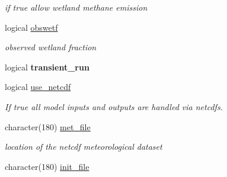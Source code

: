 \begin{DoxyCompactItemize}
\begin{DoxyCompactList}\small\item\em if true allow wetland methane emission \end{DoxyCompactList}\item 
\hypertarget{structctem__statevars_1_1ctem__switches_a009ff20d4bbfe0d7435397cf39fda85a}{}logical \hyperlink{structctem__statevars_1_1ctem__switches_a009ff20d4bbfe0d7435397cf39fda85a}{obswetf}\label{structctem__statevars_1_1ctem__switches_a009ff20d4bbfe0d7435397cf39fda85a}

\begin{DoxyCompactList}\small\item\em observed wetland fraction \end{DoxyCompactList}\item 
\hypertarget{structctem__statevars_1_1ctem__switches_a38ff512e235b3dd8a02c05d4d990ab99}{}logical {\bfseries transient\+\_\+run}\label{structctem__statevars_1_1ctem__switches_a38ff512e235b3dd8a02c05d4d990ab99}

\item 
\hypertarget{structctem__statevars_1_1ctem__switches_adaf384e9a0bf0224b86b6877b2473133}{}logical \hyperlink{structctem__statevars_1_1ctem__switches_adaf384e9a0bf0224b86b6877b2473133}{use\+\_\+netcdf}\label{structctem__statevars_1_1ctem__switches_adaf384e9a0bf0224b86b6877b2473133}

\begin{DoxyCompactList}\small\item\em If true all model inputs and outputs are handled via netcdfs. \end{DoxyCompactList}\item 
\hypertarget{structctem__statevars_1_1ctem__switches_a163869d14a74656d7aa94eebc86025ec}{}character(180) \hyperlink{structctem__statevars_1_1ctem__switches_a163869d14a74656d7aa94eebc86025ec}{met\+\_\+file}\label{structctem__statevars_1_1ctem__switches_a163869d14a74656d7aa94eebc86025ec}

\begin{DoxyCompactList}\small\item\em location of the netcdf meteorological dataset \end{DoxyCompactList}\item 
\hypertarget{structctem__statevars_1_1ctem__switches_af17d01da21648e1c911639191b97f2b2}{}character(180) \hyperlink{structctem__statevars_1_1ctem__switches_af17d01da21648e1c911639191b97f2b2}{init\+\_\+file}\label{structctem__statevars_1_1ctem__switches_af17d01da21648e1c911639191b97f2b2}


\end{DoxyCompactItemize}
